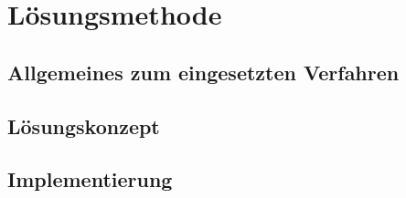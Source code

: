\section{Lösungsmethode}

\subsection[Allgemeines zum eingesetzten Verfahren]{Allgemeines zum eingesetzten Verfahren}


\subsection[Lösungskonzept]{Lösungskonzept}


\subsection[Implementierung]{Implementierung}